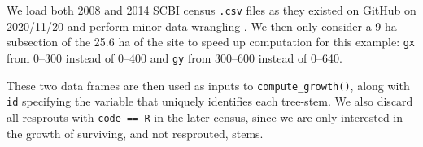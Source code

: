 \documentclass[12pt]{article}
\newenvironment{Shaded}{\begin{snugshade}}{\end{snugshade}}
\newcommand{\CommentTok}[1]{\textcolor[rgb]{0.56,0.35,0.01}{\textit{#1}}}
\newcommand{\DataTypeTok}[1]{\textcolor[rgb]{0.13,0.29,0.53}{#1}}
\newcommand{\DecValTok}[1]{\textcolor[rgb]{0.00,0.00,0.81}{#1}}
\newcommand{\KeywordTok}[1]{\textcolor[rgb]{0.13,0.29,0.53}{\textbf{#1}}}
\newcommand{\NormalTok}[1]{#1}
\newcommand{\OperatorTok}[1]{\textcolor[rgb]{0.81,0.36,0.00}{\textbf{#1}}}
\newcommand{\StringTok}[1]{\textcolor[rgb]{0.31,0.60,0.02}{#1}}
\begin{document}
We load both 2008 and 2014 SCBI census \texttt{.csv} files as they
existed on GitHub on 2020/11/20 and perform minor data wrangling
\citep{gonzalez-akre_scbi-forestgeoscbi-forestgeo-data_2020}. We then
only consider a 9 ha subsection of the 25.6 ha of the site to speed up
computation for this example: \texttt{gx} from 0--300 instead of 0--400
and \texttt{gy} from 300--600 instead of 0--640.

\begin{Shaded}
\end{Shaded}

These two data frames are then used as inputs to
\texttt{compute\_growth()}, along with \texttt{id} specifying the
variable that uniquely identifies each tree-stem. We also discard all
resprouts with \texttt{code\ ==\ R} in the later census, since we are
only interested in the growth of surviving, and not resprouted, stems.
\end{document}

